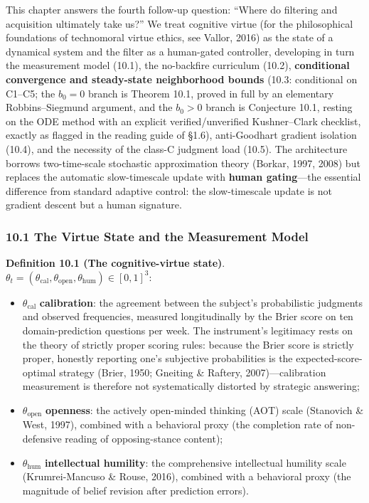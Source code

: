 \documentclass[
  11pt]{article}
\providecommand{\tightlist}{%
  \setlength{\itemsep}{0pt}\setlength{\parskip}{0pt}}
\begin{document}
This chapter answers the fourth follow-up question: ``Where do filtering
and acquisition ultimately take us?'' We treat cognitive virtue (for the
philosophical foundations of technomoral virtue ethics, see Vallor,
2016) as the state of a dynamical system and the filter as a human-gated
controller, developing in turn the measurement model (10.1), the
no-backfire curriculum (10.2), \textbf{conditional convergence and
steady-state neighborhood bounds} (10.3: conditional on C1--C5; the
\(b_0 = 0\) branch is Theorem 10.1, proved in full by an elementary
Robbins--Siegmund argument, and the \(b_0 > 0\) branch is Conjecture
10.1, resting on the ODE method with an explicit verified/unverified
Kushner--Clark checklist, exactly as flagged in the reading guide of
§1.6), anti-Goodhart gradient isolation (10.4), and the necessity of the
class-C judgment load (10.5). The architecture borrows two-time-scale
stochastic approximation theory (Borkar, 1997, 2008) but replaces the
automatic slow-timescale update with \textbf{human gating}---the
essential difference from standard adaptive control: the slow-timescale
update is not gradient descent but a human signature.

\subsubsection{10.1 The Virtue State and the Measurement
Model}\label{the-virtue-state-and-the-measurement-model}

\textbf{Definition 10.1 (The cognitive-virtue state)}.
\(\theta_t = (\theta_{\mathrm{cal}}, \theta_{\mathrm{open}}, \theta_{\mathrm{hum}}) \in [0,1]^3\):

\begin{itemize}
\tightlist
\item
  \(\theta_{\mathrm{cal}}\) \textbf{calibration}: the agreement between
  the subject's probabilistic judgments and observed frequencies,
  measured longitudinally by the Brier score on ten domain-prediction
  questions per week. The instrument's legitimacy rests on the theory of
  strictly proper scoring rules: because the Brier score is strictly
  proper, honestly reporting one's subjective probabilities is the
  expected-score-optimal strategy (Brier, 1950; Gneiting \& Raftery,
  2007)---calibration measurement is therefore not systematically
  distorted by strategic answering;
\item
  \(\theta_{\mathrm{open}}\) \textbf{openness}: the actively open-minded
  thinking (AOT) scale (Stanovich \& West, 1997), combined with a
  behavioral proxy (the completion rate of non-defensive reading of
  opposing-stance content);
\item
  \(\theta_{\mathrm{hum}}\) \textbf{intellectual humility}: the
  comprehensive intellectual humility scale (Krumrei-Mancuso \& Rouse,
  2016), combined with a behavioral proxy (the magnitude of belief
  revision after prediction errors).
\end{itemize}
\end{document}
